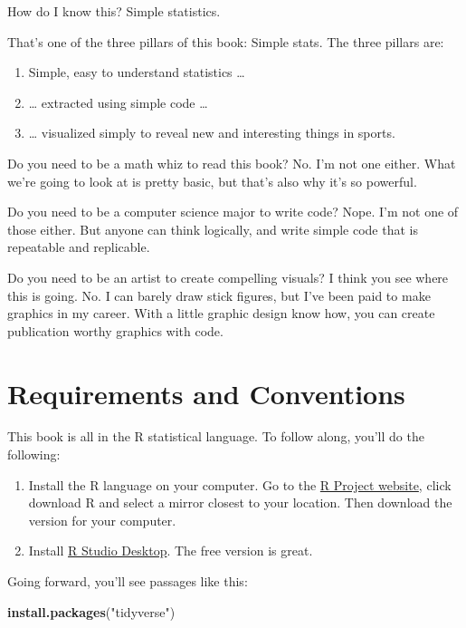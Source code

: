 \documentclass[]{book}
\newenvironment{Shaded}{\begin{snugshade}}{\end{snugshade}}
\newcommand{\KeywordTok}[1]{\textcolor[rgb]{0.13,0.29,0.53}{\textbf{#1}}}
\newcommand{\StringTok}[1]{\textcolor[rgb]{0.31,0.60,0.02}{#1}}
\newcommand{\NormalTok}[1]{#1}
\providecommand{\tightlist}{%
  \setlength{\itemsep}{0pt}\setlength{\parskip}{0pt}}
\begin{document}
How do I know this? Simple statistics.

That's one of the three pillars of this book: Simple stats. The three
pillars are:

\begin{enumerate}
\def\labelenumi{\arabic{enumi}.}
\tightlist
\item
  Simple, easy to understand statistics \ldots{}
\item
  \ldots{} extracted using simple code \ldots{}
\item
  \ldots{} visualized simply to reveal new and interesting things in
  sports.
\end{enumerate}

Do you need to be a math whiz to read this book? No. I'm not one either.
What we're going to look at is pretty basic, but that's also why it's so
powerful.

Do you need to be a computer science major to write code? Nope. I'm not
one of those either. But anyone can think logically, and write simple
code that is repeatable and replicable.

Do you need to be an artist to create compelling visuals? I think you
see where this is going. No. I can barely draw stick figures, but I've
been paid to make graphics in my career. With a little graphic design
know how, you can create publication worthy graphics with code.

\section{Requirements and
Conventions}\label{requirements-and-conventions}

This book is all in the R statistical language. To follow along, you'll
do the following:

\begin{enumerate}
\def\labelenumi{\arabic{enumi}.}
\tightlist
\item
  Install the R language on your computer. Go to the
  \href{https://www.r-project.org/}{R Project website}, click download R
  and select a mirror closest to your location. Then download the
  version for your computer.
\item
  Install \href{https://www.rstudio.com/products/rstudio/\#Desktop}{R
  Studio Desktop}. The free version is great.
\end{enumerate}

Going forward, you'll see passages like this:

\begin{Shaded}
\begin{Highlighting}[]
\KeywordTok{install.packages}\NormalTok{(}\StringTok{"tidyverse"}\NormalTok{)}
\end{Highlighting}
\end{Shaded}
\end{document}
